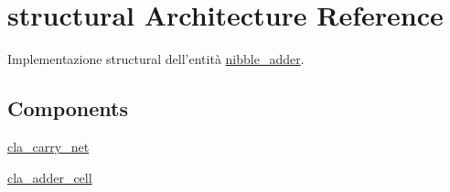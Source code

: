 \hypertarget{classnibble__adder_1_1structural}{\section{structural Architecture Reference}
\label{classnibble__adder_1_1structural}
}


Implementazione structural dell'entità \hyperlink{classnibble__adder}{nibble\+\_\+adder}.  


\subsection*{Components}
 \begin{DoxyCompactItemize}
\item 
\hyperlink{group___nibble_adder_ga12bdc5892f526938e1447d663d152df8}{cla\+\_\+carry\+\_\+net}  {\bfseries }  
\item 
\hyperlink{group___nibble_adder_ga4f13eb52457f650b1d2cd352d9cacca9}{cla\+\_\+adder\+\_\+cell}  {\bfseries }  
\end{DoxyCompactItemize}

